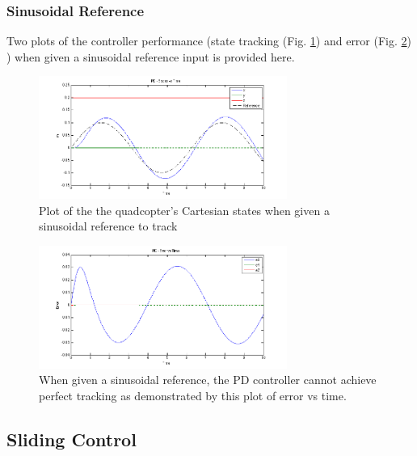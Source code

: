 \documentclass[conference]{IEEEtran}
\begin{document}
\subsubsection{Sinusoidal Reference}
Two plots of the controller performance (state tracking (Fig. \ref{fig:pd_5})  and error (Fig. \ref{fig:pd_7}) ) when given a sinusoidal reference input is provided here.
\begin{figure}[!ht]
\centering
\includegraphics[width=3.2in]{../pd_5.png}
\caption{Plot of the the quadcopter's Cartesian states when given a sinusoidal reference to track}
\label{fig:pd_5}
\end{figure}
\begin{figure}[!ht]
\centering
\includegraphics[width=3.2in]{../pd_7.png}
\caption{When given a sinusoidal reference, the PD controller cannot achieve perfect tracking as demonstrated by this plot of error vs time.}
\label{fig:pd_7}
\end{figure}

\subsection{Sliding Control}
\end{document}

